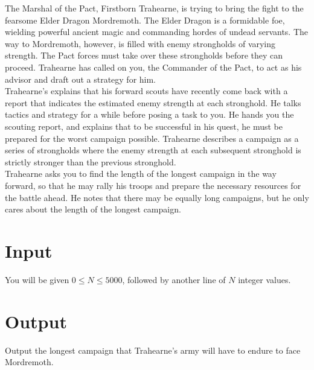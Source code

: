 
The Marshal of the Pact, Firstborn Trahearne, is trying to bring the fight to the fearsome Elder Dragon Mordremoth. The
Elder Dragon is a formidable foe, wielding powerful ancient magic and commanding hordes of undead servants. The way to
Mordremoth, however, is filled with enemy strongholds of varying strength. The Pact forces must take over these
strongholds before they can proceed. Trahearne has called on you, the Commander of the Pact, to act as his advisor and
draft out a strategy for him. \\

Trahearne’s explains that his forward scouts have recently come back with a report that indicates the estimated enemy
strength at each stronghold. He talks tactics and strategy for a while before posing a task to you. He hands you the
scouting report, and explains that to be successful in his quest, he must be prepared for the worst campaign possible.
Trahearne describes a campaign as a series of strongholds where the enemy strength at each subsequent stronghold is
strictly stronger than the previous stronghold. \\

Trahearne asks you to find the length of the longest campaign in the way forward, so that he may rally his troops and
prepare the necessary resources for the battle ahead. He notes that there may be equally long campaigns, but he only
cares about the length of the longest campaign. \\


\section*{Input}
You will be given $0 \leq N \leq 5000$, followed by another line of $N$ integer values.
\section*{Output}
Output the longest campaign that Trahearne’s army will have to endure to face Mordremoth. \\
